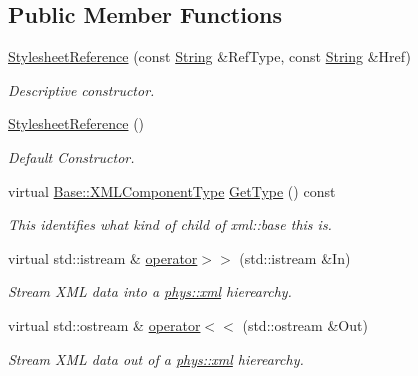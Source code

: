 \subsection*{Public Member Functions}
\begin{DoxyCompactItemize}
\item 
\hyperlink{classphys_1_1xml_1_1StylesheetReference_a83706ad4edd90963b7098a24459a724b}{StylesheetReference} (const \hyperlink{namespacephys_aa03900411993de7fbfec4789bc1d392e}{String} \&RefType, const \hyperlink{namespacephys_aa03900411993de7fbfec4789bc1d392e}{String} \&Href)
\begin{DoxyCompactList}\small\item\em Descriptive constructor. \item\end{DoxyCompactList}\item 
\hyperlink{classphys_1_1xml_1_1StylesheetReference_a4debe0aa91149a131563c59155dd5f69}{StylesheetReference} ()
\begin{DoxyCompactList}\small\item\em Default Constructor. \item\end{DoxyCompactList}\item 
virtual \hyperlink{classphys_1_1xml_1_1Base_a62ba0484b5ecb502f9ae9d82d3720320}{Base::XMLComponentType} \hyperlink{classphys_1_1xml_1_1StylesheetReference_a2dedf6dc246ae14d7c261e02537369b1}{GetType} () const 
\begin{DoxyCompactList}\small\item\em This identifies what kind of child of xml::base this is. \item\end{DoxyCompactList}\item 
virtual std::istream \& \hyperlink{classphys_1_1xml_1_1StylesheetReference_af9764a5458eca7dd55eda1b390dfda3a}{operator$>$$>$} (std::istream \&In)
\begin{DoxyCompactList}\small\item\em Stream XML data into a \hyperlink{namespacephys_1_1xml}{phys::xml} hierearchy. \item\end{DoxyCompactList}\item 
virtual std::ostream \& \hyperlink{classphys_1_1xml_1_1StylesheetReference_a1513e32b1c4ea3c59bb172be75b39e43}{operator$<$$<$} (std::ostream \&Out)
\begin{DoxyCompactList}\small\item\em Stream XML data out of a \hyperlink{namespacephys_1_1xml}{phys::xml} hierearchy. \item\end{DoxyCompactList}\item 

\end{DoxyCompactItemize}
